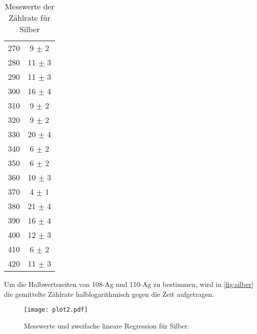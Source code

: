 \begin{table}
\begin{tabular}{c c}
    270 &  9 $\pm$ 2 \\
    280 & 11 $\pm$ 3 \\
    290 & 11 $\pm$ 3 \\
    300 & 16 $\pm$ 4 \\
    310 &  9 $\pm$ 2 \\
    320 &  9 $\pm$ 2 \\
    330 & 20 $\pm$ 4 \\
    340 &  6 $\pm$ 2 \\
    350 &  6 $\pm$ 2 \\
    360 & 10 $\pm$ 3 \\
    370 &  4 $\pm$ 1 \\
    380 & 21 $\pm$ 4 \\
    390 & 16 $\pm$ 4 \\
    400 & 12 $\pm$ 3 \\
    410 &  6 $\pm$ 2 \\
    420 & 11 $\pm$ 3 \\
    \bottomrule
  \end{tabular}
  \caption{Messwerte der Zählrate für Silber}
  \label{tab:silber}
\end{table}
Um die Halbwertszeiten von 108-Ag und 110-Ag zu bestimmen, wird in \autoref{fig:silber} die gemittelte Zählrate
halblogarithmisch gegen die Zeit aufgetragen.
\begin{figure}
  \centering
  \texttt{[image: plot2.pdf]}
  \caption{Messwerte und zweifache lineare Regression für Silber.}
  \label{fig:silber}
\end{figure}